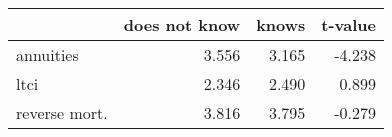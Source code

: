 \begin{tabular}{lrrr}
\toprule
{} &  does not know &  knows &  t-value \\
\midrule
annuities     &          3.556 &  3.165 &   -4.238 \\
ltci          &          2.346 &  2.490 &    0.899 \\
reverse mort. &          3.816 &  3.795 &   -0.279 \\
\bottomrule
\end{tabular}
